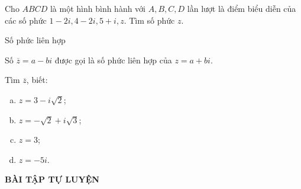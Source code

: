 \begin{bt}%
	Cho $ABCD$ là một hình bình hành với $A,B,C,D$ lần lượt là điểm biểu diễn của các số phức $1-2i,4-2i,5+i,z$. Tìm số phức $z$.
\end{bt}
\begin{dang}{Số phức liên hợp}
	\begin{center}
		Số $\overline{z}=a-bi$ được gọi là số phức liên hợp của $z=a+bi$.
	\end{center}
\end{dang}
\begin{vd}%
	Tìm $\overline{z}$, biết:
	\begin{multicols}{2}
		\begin{enumerate}[a.]
			\item $z=3-i\sqrt{2}$;
			\item $z=-\sqrt{2}+i\sqrt{3}$;
			\item $z=3$;
			\item $z=-5i$.
		\end{enumerate}
	\end{multicols}
\end{vd}
\begin{center}
	\textbf{BÀI TẬP TỰ LUYỆN}
\end{center}

